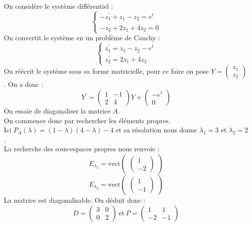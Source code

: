 \begin{ex}
On considère le système différentiel :
$$\begin{cases}
-z_1^{\prime}+z_1-z_2=e^{t}\\
-z_2^{\prime}+2z_1+4z_2=0
\end{cases}$$
On convertit le système en un problème de Cauchy :
$$\begin{cases}
z_1^{\prime}=z_1-z_2-e^{t}\\
z_2^{\prime}=2z_1+4z_2
\end{cases}$$
On réécrit le système sous sa forme matricielle, pour ce faire on pose $Y=\begin{pmatrix}z_1\\z_2\end{pmatrix}$. On a donc :
$$Y^{\prime}=\begin{pmatrix}1&-1\\2&4\end{pmatrix}Y+\begin{pmatrix}-e^t\\0\end{pmatrix}$$
On essaie de diagonaliser la matrice $A$.\\
On commence donc par rechercher les éléments propres.\\
Ici $P_A(\lambda)=(1-\lambda)(4-\lambda)-4$ et sa résolution nous donne $\lambda_1=3$ et $\lambda_2=2$.\\
La recherche des sous-espaces propres nous renvoie :
$$E_{\lambda_1}=\text{vect}\begin{pmatrix}\begin{pmatrix}1\\-2\end{pmatrix}\end{pmatrix}$$
$$E_{\lambda_2}=\text{vect}\begin{pmatrix}\begin{pmatrix}1\\-1\end{pmatrix}\end{pmatrix}$$
La matrice est diagonalisable. On déduit donc :\\
$$D=\begin{pmatrix}3&0\\0&2\end{pmatrix}\ \text{et}\ P=\begin{pmatrix}1&1\\-2&-1\end{pmatrix}$$

\end{ex}

